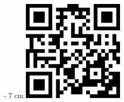 \documentclass[rgb]{article}
\begin{document}
\begin{textfeld}{0cm}{\paperheight - 7 cm}
	\rightskip 2cm
	\hfill\includegraphics[height=5cm]{qrcps.png}
\end{textfeld}
\end{document}
